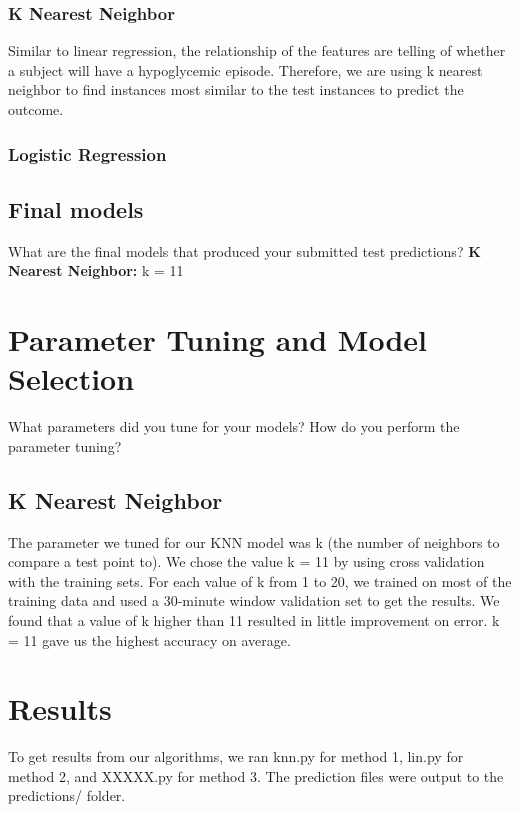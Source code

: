 \documentclass[11pt,a4paper]{article}
\begin{document}
\subsubsection{K Nearest Neighbor}
Similar to linear regression, the relationship of the features are telling of whether a subject will have a hypoglycemic episode. Therefore, we are using k nearest neighbor to find instances most similar to the test instances to predict the outcome.
\subsubsection{Logistic Regression}
\subsection{Final models}
What are the final models that produced your submitted test predictions?
\textbf{K Nearest Neighbor: }k = 11

\section{Parameter Tuning and Model Selection }
What parameters did you tune for your models? How do you perform the parameter tuning?
\subsection{K Nearest Neighbor}
The parameter we tuned for our KNN model was k (the number of neighbors to compare a test point to). We chose the value k = 11 by using cross validation with the training sets. For each value of k from 1 to 20, we trained on most of the training data and used a 30-minute window validation set to get the results. We found that a value of k higher than 11 resulted in little improvement on error. k = 11 gave us the highest accuracy on average.

\section{Results}
To get results from our algorithms, we ran knn.py for method 1, lin.py for method 2, and XXXXX.py for method 3. The prediction files were output to the predictions/ folder. 
\end{document}
